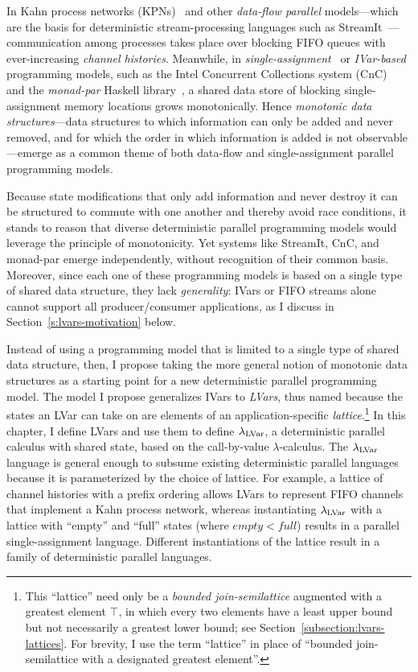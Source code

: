 In Kahn process networks (KPNs)~\cite{Kahn-1974} and other
\emph{data-flow parallel} models---which are the basis for
deterministic stream-processing languages such as
StreamIt~\cite{streamit-asplos}---communication among processes takes
place over blocking FIFO queues with ever-increasing \emph{channel
  histories}.  Meanwhile, in
\emph{single-assignment}~\cite{Tesler-1968} or
\emph{IVar-based}~\cite{IStructures} programming models, such as the
Intel Concurrent Collections system (CnC)~\cite{CnC} and the
\emph{monad-par} Haskell library~\cite{monad-par}, a shared data store
of blocking single-assignment memory locations grows monotonically.
Hence \emph{monotonic data structures}---data structures to which
information can only be added and never removed, and for which the
order in which information is added is not observable---emerge as a
common theme of both data-flow and single-assignment parallel
programming models.

Because state modifications that only add information and never
destroy it can be structured to commute with one another and thereby
avoid race conditions, it stands to reason that diverse deterministic
parallel programming models would leverage the principle of
monotonicity.  Yet systems like StreamIt, CnC, and monad-par emerge
independently, without recognition of their common basis.  Moreover,
since each one of these programming models is based on a single type
of shared data structure, they lack \emph{generality}: IVars or FIFO
streams alone cannot support all producer/consumer applications, as I
discuss in Section~\ref{s:lvars-motivation} below.

Instead of using a programming model that is limited to a single type
of shared data structure, then, I propose taking the more general
notion of monotonic data structures as a starting point for a new
deterministic parallel programming model.  The model I propose
generalizes IVars to \emph{LVars}, thus named because the states an
LVar can take on are elements of an
application-specific \emph{lattice}.\footnote{This ``lattice'' need
only be a \emph{bounded join-semilattice} augmented with a greatest
element $\top$, in which every two elements have a least upper bound
but not necessarily a greatest lower bound; see
Section~\ref{subsection:lvars-lattices}.  For brevity, I use the term
``lattice'' in place of ``bounded join-semilattice with a designated
greatest element''.}  In this chapter, I define LVars and use them to
define $\lambda_{\textrm{LVar}}$, a deterministic parallel calculus with shared
state, based on the call-by-value $\lambda$-calculus.  The
$\lambda_{\textrm{LVar}}$ language is general enough to subsume existing
deterministic parallel languages because it is parameterized by the
choice of lattice.  For example, a lattice of channel histories with a
prefix ordering allows LVars to represent FIFO channels that implement
a Kahn process network, whereas instantiating $\lambda_{\textrm{LVar}}$ with a
lattice with ``empty'' and ``full'' states (where $\mathit{empty} <
\mathit{full}$) results in a parallel single-assignment language.
Different instantiations of the lattice result in a family of
deterministic parallel languages.

